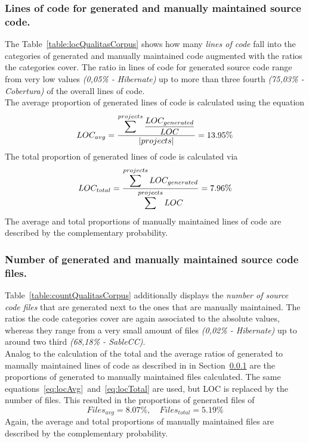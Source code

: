 \subsubsection{Lines of code for generated and manually maintained source code.}
\label{section:qualitasCorpusLOC}
The Table~\ref{table:locQualitasCorpus} shows how many \textit{lines of code} fall into the categories of generated and manually maintained code augmented with the ratios the categories cover. The ratio in lines of code for generated source code range from very low values \textit{(0,05\% - Hibernate)} up to more than three fourth \textit{(75,03\% - Cobertura)} of the overall lines of code.\\
The average proportion of generated lines of code is calculated using the equation
\begin{equation}
	\label{eq:locAvg}
	LOC_{avg} = \frac{\mathlarger{\sum^{projects} \frac{LOC_{generated}}{LOC}}}{|projects|} = 13.95\%
\end{equation}
The total proportion of generated lines of code is calculated via
\begin{equation}
	\label{eq:locTotal}
	LOC_{total} = \frac{\mathlarger{\sum^{projects} LOC_{generated}}}{\mathlarger{\sum^{projects} LOC}} = 7.96\%
\end{equation} 
The average and total proportions of manually maintained lines of code are described by the complementary probability.

\subsubsection{Number of generated and manually maintained source code files.}
Table~\ref{table:countQualitasCorpus} additionally displays the \textit{number of source code files} that are generated next to the ones that are manually maintained. The ratios the code categories cover are again associated to the absolute values, whereas they range from a very small amount of files \textit{(0,02\% - Hibernate)} up to around two third \textit{(68,18\% - SableCC)}.\\
Analog to the calculation of the total and the average ratios of generated to manually maintained lines of code as described in in Section~\ref{section:qualitasCorpusLOC} are the proportions of generated to manually maintained files calculated. The same equations~\ref{eq:locAvg}~and~\ref{eq:locTotal} are used, but LOC is replaced by the number of files. %
This resulted in the proportions of generated files of
\begin{equation}
	Files_{avg} = 8.07\%, \quad Files_{total} = 5.19\%
\end{equation} 
Again, the average and total proportions of manually maintained files are described by the complementary probability.


